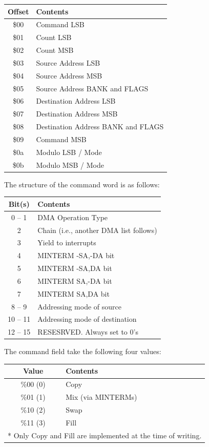 \begin{tabular}{|c|l|}
  \hline
  Offset & Contents \\
  \hline
  \$00 & Command LSB \\
  \$01 & Count LSB \\
  \$02 & Count MSB \\
  \$03 & Source Address LSB  \\
  \$04 & Source Address MSB \\
  \$05 & Source Address BANK and FLAGS \\
  \$06 & Destination Address LSB  \\
  \$07 & Destination Address MSB \\
  \$08 & Destination Address BANK and FLAGS \\
  \$09 & Command MSB \\
  \$0a & Modulo LSB / Mode \\
  \$0b & Modulo MSB / Mode \\
  \hline
\end{tabular}

The structure of the command word is as follows:

\begin{tabular}{|c|l|}
  \hline
  Bit(s) & Contents \\
  \hline
  0 -- 1 & DMA Operation Type \\
  2 & Chain (i.e., another DMA list follows) \\
  3 & Yield to interrupts \\
  4 & MINTERM -SA,-DA bit \\
  5 & MINTERM -SA,DA bit \\
  6 & MINTERM SA,-DA bit \\
  7 & MINTERM SA,DA bit \\
  8 -- 9 & Addressing mode of source \\
  10 -- 11 & Addressing mode of destination \\
  12 -- 15 & RESESRVED. Always set to 0's \\
  \hline
\end{tabular}

The command field take the following four values:

\begin{tabular}{|c|l|}
  \hline
  Value & Contents \\
  \hline
  \%00 (0) & Copy \\
  \%01 (1) & Mix (via MINTERMs) \\
  \%10 (2) & Swap \\
  \%11 (3) & Fill \\
  \hline
  \multicolumn{2}{l}{* Only Copy and Fill are implemented at the time of writing.}
\end{tabular}


